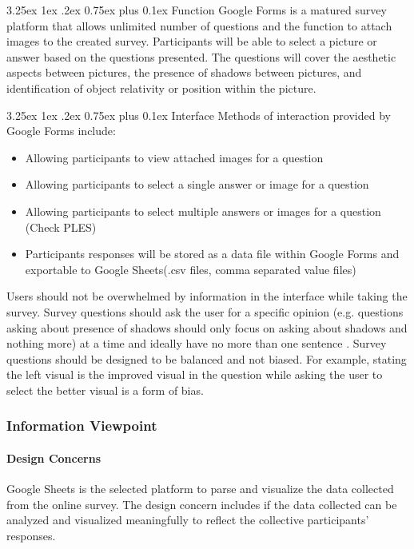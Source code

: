 \documentclass[10pt,journal,compsoc,draftclsnofoot]{IEEEtran}
\makeatletter
\newcommand\subparagraph{%
  \@startsection{subparagraph}{5}
  {\parindent}
  {3.25ex \@plus 1ex \@minus .2ex}
  {0.75ex plus 0.1ex}
  {\normalfont\normalsize\bfseries}}
\makeatother
\begin{document}
\begin{flushleft}
\subparagraph{Function}
Google Forms \cite{googleforms} is a matured survey platform that allows unlimited number of questions and the function to attach images to the created survey.
Participants will be able to select a picture or answer based on the questions presented. 
The questions will cover the aesthetic aspects between pictures, the presence of shadows between pictures, and identification of object relativity or position within the picture. 

\subparagraph{Interface}
Methods of interaction provided by Google Forms include:
\begin{itemize}
\item Allowing participants to view attached images for a question
\item Allowing participants to select a single answer or image for a question
\item Allowing participants to select multiple answers or images for a question (Check PLES)
\item Participants responses will be stored as a data file within Google Forms and exportable to Google Sheets(.csv files, comma separated value files)
\end{itemize}

Users should not be overwhelmed by information in the interface while taking the survey.
Survey questions should ask the user for a specific opinion (e.g. questions asking about presence of shadows should only focus on asking about shadows and nothing more) at a time and ideally have no more than one sentence \cite{SMquestions}. 
Survey questions should be designed to be balanced and not biased.
For example, stating the left visual is the improved visual in the question while asking the user to select the better visual is a form of bias.  

\newpage

\subsubsection{Information Viewpoint}
\paragraph{Design Concerns}
Google Sheets \cite{googlesheets} is the selected platform to parse and visualize the data collected from the online survey. 
The design concern includes if the data collected can be analyzed and visualized meaningfully to reflect the collective participants’ responses.
\vspace{3mm}


\end{flushleft}
\end{document}
